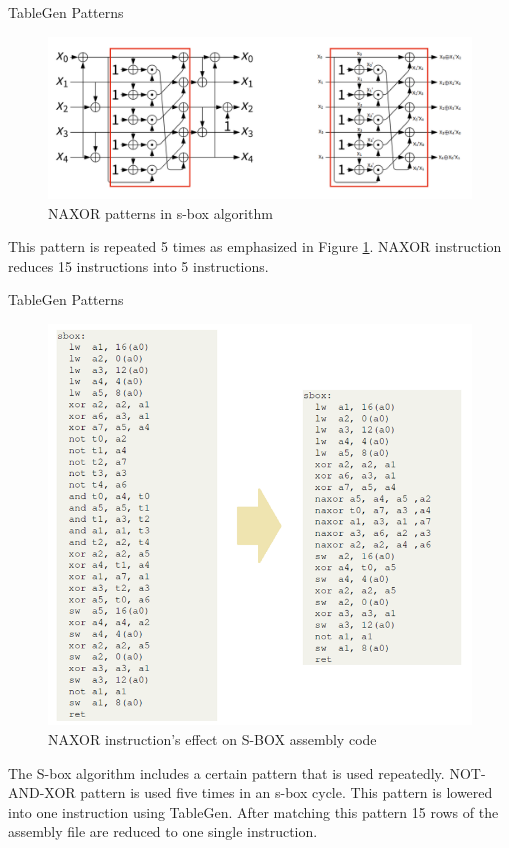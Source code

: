 \begin{frame}[fragile]{TableGen Patterns}
\begin{figure}
    \centering
    \includegraphics[scale=0.15]{sbox_naxor_pattern.png}
    \caption{NAXOR patterns in s-box algorithm}
    \label{fig:sbox_naxor_pattern}
\end{figure}
This pattern is repeated 5 times as emphasized in Figure \ref{fig:sbox_naxor_pattern}. NAXOR instruction reduces 15 instructions into 5 instructions.
\end{frame}



\begin{frame}[fragile]{TableGen Patterns}
\begin{figure}
    \centering
    \includegraphics[scale=0.27]{naxor_instruction.png}
    \caption{NAXOR instruction's effect on S-BOX assembly code}
    \label{fig:sbox_instruction}
\end{figure}
The S-box algorithm includes a certain pattern that is used repeatedly.
NOT-AND-XOR pattern is used five times in an s-box cycle. This pattern is lowered
into one instruction using TableGen. After matching this pattern 15 rows of the
assembly file are reduced to one single instruction.
\end{frame}
